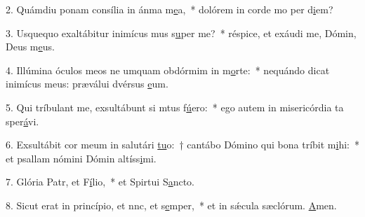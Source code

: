 2. Quámdiu ponam consília in ánma m\uline{e}a,~* dolórem in corde mo per d\uline{i}em?\par 
3. Usquequo exaltábitur inimícus mus s\uline{u}per me?~* réspice, et exáudi me, Dómin, Deus m\uline{e}us.\par 
4. Illúmina óculos meos ne umquam obdórmim in m\uline{o}rte:~* nequándo dicat inimícus meus: præválui dvérsus \uline{e}um.\par 
5. Qui tríbulant me, exsultábunt si mtus f\uline{ú}ero:~* ego autem in misericórdia ta sper\uline{á}vi.\par 
6. Exsultábit cor meum in salutári \uline{tu}o:~† cantábo Dómino qui bona tríbit m\uline{i}hi:~* et psallam nómini Dómin altíss\uline{i}mi.\par 
7. Glória Patr, et F\uline{í}lio,~* et Spirtui S\uline{a}ncto.\par 
8. Sicut erat in princípio, et nnc, et s\uline{e}mper,~* et in sǽcula sæclórum. \uline{A}men.\par 
